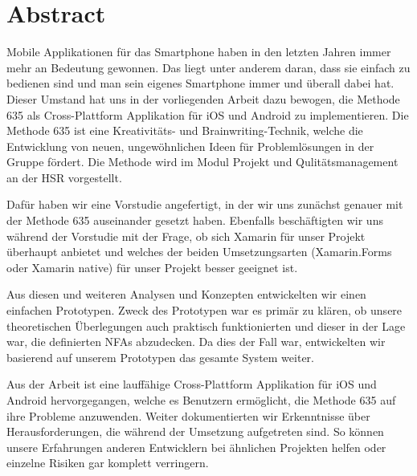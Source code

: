 \section{Abstract}
Mobile Applikationen für das Smartphone haben in den letzten Jahren immer mehr an Bedeutung gewonnen. Das liegt unter anderem daran, dass sie einfach zu bedienen sind und man sein eigenes Smartphone immer und überall dabei hat. Dieser Umstand hat uns in der vorliegenden Arbeit dazu bewogen, die Methode 635 als Cross-Plattform Applikation für iOS und Android zu implementieren. Die Methode 635 ist eine Kreativitäts- und Brainwriting-Technik, welche die Entwicklung von neuen, ungewöhnlichen Ideen für Problemlösungen in der Gruppe fördert. Die Methode wird im Modul \grqq Projekt und Qulitätsmanagement\grqq{} an der HSR vorgestellt.

Dafür haben wir eine Vorstudie angefertigt, in der wir uns zunächst genauer mit der Methode 635 auseinander gesetzt haben. Ebenfalls beschäftigten wir uns während der Vorstudie mit der Frage, ob sich Xamarin für unser Projekt überhaupt anbietet und welches der beiden Umsetzungsarten (Xamarin.Forms oder Xamarin native) für unser Projekt besser geeignet ist.

Aus diesen und weiteren Analysen und Konzepten entwickelten wir einen einfachen Prototypen. Zweck des Prototypen war es primär zu klären, ob unsere theoretischen Überlegungen auch praktisch funktionierten und dieser in der Lage war, die definierten NFAs abzudecken. Da dies der Fall war, entwickelten wir basierend auf unserem Prototypen das gesamte System weiter.

Aus der Arbeit ist eine lauffähige Cross-Plattform Applikation für iOS und Android hervorgegangen, welche es Benutzern ermöglicht, die Methode 635 auf ihre Probleme anzuwenden. Weiter dokumentierten wir Erkenntnisse über Herausforderungen, die während der Umsetzung aufgetreten sind. So können unsere Erfahrungen anderen Entwicklern bei ähnlichen Projekten helfen oder einzelne Risiken gar komplett verringern. 